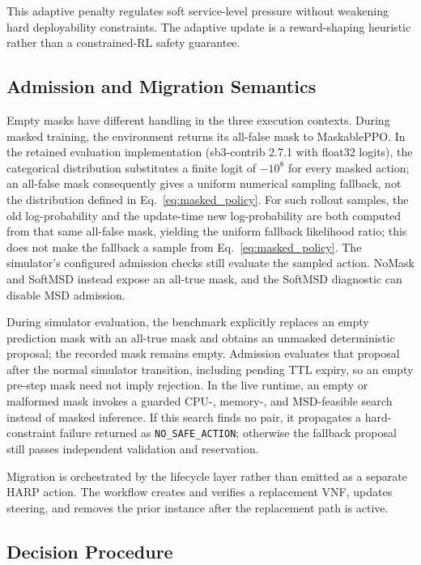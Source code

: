 \documentclass[final,5p]{elsarticle}
\newcommand{\rev}[1]{\textcolor{revisiongreen}{#1}}
\let\newrev\rev
\begin{document}
This adaptive penalty regulates soft service-level pressure without weakening hard deployability constraints. \rev{The adaptive update is a reward-shaping heuristic rather than a constrained-RL safety guarantee. }

\subsection{Admission and Migration Semantics}
\label{subsec:harp_admission}
\newrev{Empty masks have different handling in the three execution contexts. During masked training, the environment returns its all-false mask to MaskablePPO. In the retained evaluation implementation (sb3-contrib 2.7.1 with float32 logits), the categorical distribution substitutes a finite logit of \(-10^8\) for every masked action; an all-false mask consequently gives a uniform numerical sampling fallback, not the distribution defined in Eq.~\eqref{eq:masked_policy}. For such rollout samples, the old log-probability and the update-time new log-probability are both computed from that same all-false mask, yielding the uniform fallback likelihood ratio; this does not make the fallback a sample from Eq.~\eqref{eq:masked_policy}. The simulator's configured admission checks still evaluate the sampled action. NoMask and SoftMSD instead expose an all-true mask, and the SoftMSD diagnostic can disable MSD admission.}

\newrev{During simulator evaluation, the benchmark explicitly replaces an empty prediction mask with an all-true mask and obtains an unmasked deterministic proposal; the recorded mask remains empty. Admission evaluates that proposal after the normal simulator transition, including pending TTL expiry, so an empty pre-step mask need not imply rejection. In the live runtime, an empty or malformed mask invokes a guarded CPU-, memory-, and MSD-feasible search instead of masked inference. If this search finds no pair, it propagates a hard-constraint failure returned as \texttt{NO\_SAFE\_ACTION}; otherwise the fallback proposal still passes independent validation and reservation.}

Migration is orchestrated by the lifecycle layer rather than emitted as a separate HARP action. The workflow creates and verifies a replacement VNF, updates steering, and removes the prior instance after the replacement path is active.

\subsection{Decision Procedure}
\label{subsec:harp_decision_procedure}
\end{document}
